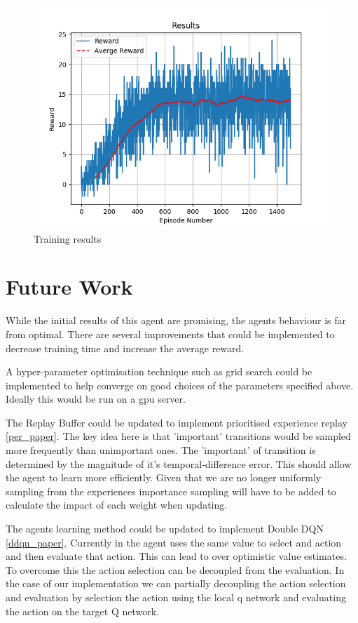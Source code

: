 \documentclass[12pt]{article}
\begin{document}
\begin{figure}
	\includegraphics[width=\linewidth]{./img/Results.png}
	\caption{Training results}
	\label{results}
\end{figure}

\section{Future Work}
While the initial results of this agent are promising, the agents behaviour is far from optimal.
There are several improvements that could be implemented to decrease training time and increase the average reward.

A hyper-parameter optimisation technique such as grid search could be implemented to help converge on good choices of the parameters 
specified above. Ideally this would be run on a gpu server.

The Replay Buffer could be updated to implement prioritised experience replay \ref{per_paper}. 
The key idea here is that 'important' transitions would be sampled more frequently than unimportant ones. 
The 'important' of transition is determined by the magnitude of it's temporal-difference error.
This should allow the agent to learn more efficiently. 
Given that we are no longer uniformly sampling from the experiences importance sampling will have to be added to calculate the impact of each weight when updating.

The agents learning method could be updated to implement Double DQN \ref{ddqn_paper}. 
Currently in the agent uses the same value to select and action and then evaluate that action.
This can lead to over optimistic value estimates.
To overcome this the action selection can be decoupled from the evaluation.
In the case of our implementation we can partially decoupling the action selection and evaluation by selection the action using the local q network and evaluating the action on the target Q network.
\end{document}
